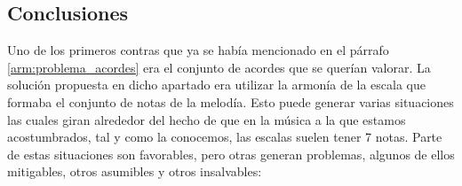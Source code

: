 \subsection{Conclusiones} 

    Uno de los primeros contras que ya se había mencionado en el párrafo \ref{arm:problema_acordes} era el conjunto de acordes que se querían valorar. La solución propuesta en dicho apartado era utilizar la armonía de la escala que formaba el conjunto de notas de la melodía. Esto puede generar varias situaciones las cuales giran alrededor del hecho de que en la música a la que estamos acostumbrados, tal y como la conocemos, las escalas suelen tener 7 notas. Parte de estas situaciones son favorables, pero otras generan problemas, algunos de ellos mitigables, otros asumibles y otros insalvables:

